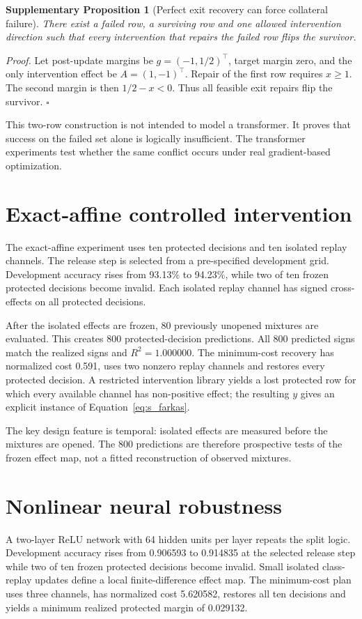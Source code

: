 \documentclass[11pt,letterpaper]{article}
\theoremstyle{plain}
\newtheorem{proposition}{Supplementary Proposition}
\newcommand{\1}{\mathbf 1}
\begin{document}
\begin{proposition}[Perfect exit recovery can force collateral failure]
There exist a failed row, a surviving row and one allowed intervention direction such that every intervention that repairs the failed row flips the survivor.
\end{proposition}
\textit{Proof.} Let post-update margins be $g=(-1,1/2)^\top$, target margin zero, and the only intervention effect be $A=(1,-1)^\top$. Repair of the first row requires $x\ge1$. The second margin is then $1/2-x<0$. Thus all feasible exit repairs flip the survivor. \(\square\)

This two-row construction is not intended to model a transformer. It proves that success on the failed set alone is logically insufficient. The transformer experiments test whether the same conflict occurs under real gradient-based optimization.

\section{Exact-affine controlled intervention}
The exact-affine experiment uses ten protected decisions and ten isolated replay channels. The release step is selected from a pre-specified development grid. Development accuracy rises from 93.13\% to 94.23\%, while two of ten frozen protected decisions become invalid. Each isolated replay channel has signed cross-effects on all protected decisions.

After the isolated effects are frozen, 80 previously unopened mixtures are evaluated. This creates 800 protected-decision predictions. All 800 predicted signs match the realized signs and $R^2=1.000000$. The minimum-cost recovery has normalized cost 0.591, uses two nonzero replay channels and restores every protected decision. A restricted intervention library yields a lost protected row for which every available channel has non-positive effect; the resulting $y$ gives an explicit instance of Equation~\ref{eq:s_farkas}.

The key design feature is temporal: isolated effects are measured before the mixtures are opened. The 800 predictions are therefore prospective tests of the frozen effect map, not a fitted reconstruction of observed mixtures.

\section{Nonlinear neural robustness}
A two-layer ReLU network with 64 hidden units per layer repeats the split logic. Development accuracy rises from 0.906593 to 0.914835 at the selected release step while two of ten frozen protected decisions become invalid. Small isolated class-replay updates define a local finite-difference effect map. The minimum-cost plan uses three channels, has normalized cost 5.620582, restores all ten decisions and yields a minimum realized protected margin of 0.029132.
\end{document}
